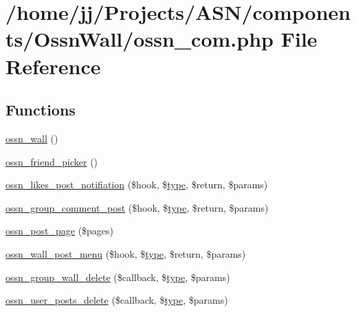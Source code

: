 \hypertarget{_ossn_wall_2ossn__com_8php}{}\section{/home/jj/\+Projects/\+A\+S\+N/components/\+Ossn\+Wall/ossn\+\_\+com.php File Reference}
\label{_ossn_wall_2ossn__com_8php}
\subsection*{Functions}
\begin{DoxyCompactItemize}
\item 
\hyperlink{_ossn_wall_2ossn__com_8php_af8a650677b86c5bbbec7c92f7cfbed0f}{ossn\+\_\+wall} ()
\item 
\hyperlink{_ossn_wall_2ossn__com_8php_a97c051a03553a6742057d456918165c2}{ossn\+\_\+friend\+\_\+picker} ()
\item 
\hyperlink{_ossn_wall_2ossn__com_8php_abfe805de5ee091625d9bfa9c842cb3dc}{ossn\+\_\+likes\+\_\+post\+\_\+notifiation} (\$hook, \$\hyperlink{_ossn_wall_2actions_2wall_2post_2group_8php_a2dc1bb4e1ed0029daa81ac0776b14b51}{type}, \$return, \$params)
\item 
\hyperlink{_ossn_wall_2ossn__com_8php_a7a3b535d41456af0e5265afd4ff7d639}{ossn\+\_\+group\+\_\+comment\+\_\+post} (\$hook, \$\hyperlink{_ossn_wall_2actions_2wall_2post_2group_8php_a2dc1bb4e1ed0029daa81ac0776b14b51}{type}, \$return, \$params)
\item 
\hyperlink{_ossn_wall_2ossn__com_8php_a2056a0935ad3822b65ed8aaefc66e2f1}{ossn\+\_\+post\+\_\+page} (\$pages)
\item 
\hyperlink{_ossn_wall_2ossn__com_8php_a60a56a00cce2013ba3453404108cfeda}{ossn\+\_\+wall\+\_\+post\+\_\+menu} (\$hook, \$\hyperlink{_ossn_wall_2actions_2wall_2post_2group_8php_a2dc1bb4e1ed0029daa81ac0776b14b51}{type}, \$return, \$params)
\item 
\hyperlink{_ossn_wall_2ossn__com_8php_aaee878a07613b79425750757109579b6}{ossn\+\_\+group\+\_\+wall\+\_\+delete} (\$callback, \$\hyperlink{_ossn_wall_2actions_2wall_2post_2group_8php_a2dc1bb4e1ed0029daa81ac0776b14b51}{type}, \$params)
\item 
\hyperlink{_ossn_wall_2ossn__com_8php_ace07485d49a607063da2e0068ad385ac}{ossn\+\_\+user\+\_\+posts\+\_\+delete} (\$callback, \$\hyperlink{_ossn_wall_2actions_2wall_2post_2group_8php_a2dc1bb4e1ed0029daa81ac0776b14b51}{type}, \$params)

\end{DoxyCompactItemize}
